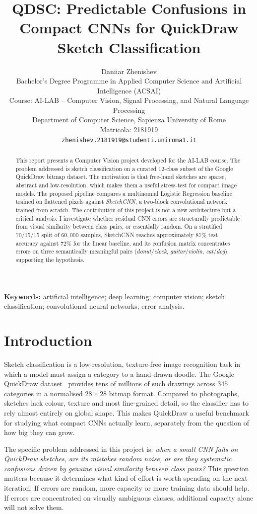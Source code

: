 \documentclass[10pt,twocolumn,a4paper]{article}
\title{\textbf{QDSC: Predictable Confusions in Compact CNNs for QuickDraw Sketch Classification}}
\author{
	Daniiar Zhenishev\\
	Bachelor's Degree Programme in Applied Computer Science and Artificial Intelligence (ACSAI)\\
	Course: AI-LAB -- Computer Vision, Signal Processing, and Natural Language Processing\\
	Department of Computer Science, Sapienza University of Rome\\
	Matricola: 2181919\\
	\texttt{zhenishev.2181919@studenti.uniroma1.it}
}
\date{}
\begin{document}
\maketitle

\begin{abstract}
This report presents a Computer Vision project developed for the AI-LAB course.
The problem addressed is sketch classification on a curated 12-class subset of
the Google QuickDraw bitmap dataset. The motivation is that free-hand sketches
are sparse, abstract and low-resolution, which makes them a useful stress-test
for compact image models. The proposed pipeline compares a multinomial Logistic
Regression baseline trained on flattened pixels against \emph{SketchCNN}, a
two-block convolutional network trained from scratch. The contribution of this
project is not a new architecture but a critical analysis: I investigate
whether residual CNN errors are structurally predictable from visual similarity
between class pairs, or essentially random. On a stratified $70/15/15$ split of
$60{,}000$ samples, SketchCNN reaches approximately $87\%$ test accuracy
against $72\%$ for the linear baseline, and its confusion matrix concentrates
errors on three semantically meaningful pairs (\emph{donut}/\emph{clock},
\emph{guitar}/\emph{violin}, \emph{cat}/\emph{dog}), supporting the hypothesis.
\end{abstract}

\noindent\textbf{Keywords:} artificial intelligence; deep learning; computer
vision; sketch classification; convolutional neural networks; error analysis.

\section{Introduction}

Sketch classification is a low-resolution, texture-free image recognition task
in which a model must assign a category to a hand-drawn doodle. The Google
QuickDraw dataset~\cite{quickdraw} provides tens of millions of such drawings
across $345$ categories in a normalised $28\times28$ bitmap format. Compared to
photographs, sketches lack colour, texture and most fine-grained detail, so the
classifier has to rely almost entirely on global shape. This makes QuickDraw a
useful benchmark for studying what compact CNNs actually learn, separately
from the question of how big they can grow.

The specific problem addressed in this project is: \emph{when a small CNN
fails on QuickDraw sketches, are its mistakes random noise, or are they
systematic confusions driven by genuine visual similarity between class pairs?}
This question matters because it determines what kind of effort is worth
spending on the next iteration. If errors are random, more capacity or more
training data should help. If errors are concentrated on visually ambiguous
classes, additional capacity alone will not solve them.
\end{document}
